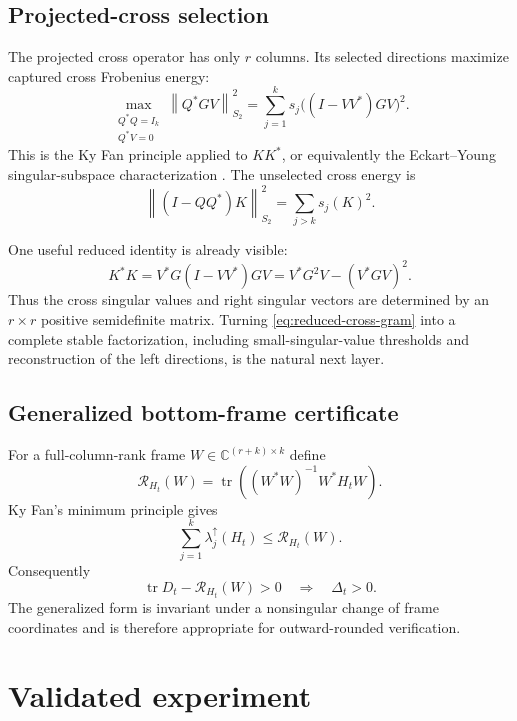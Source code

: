 \documentclass[11pt]{article}
\theoremstyle{definition}
\theoremstyle{remark}
\newcommand{\norm}[1]{\left\lVert#1\right\rVert}
\newcommand{\tr}{\operatorname{tr}}
\begin{document}
\subsection{Projected-cross selection}

The projected cross operator has only $r$ columns.  Its selected directions
maximize captured cross Frobenius energy:
\begin{equation}
 \max_{\substack{Q^*Q=I_k\\Q^*V=0}}
 \norm{Q^*GV}_{S_2}^2
 =\sum_{j=1}^k s_j\big((I-VV^*)GV\big)^2.
 \label{eq:cross-max}
\end{equation}
This is the Ky Fan principle applied to $KK^*$, or equivalently the
Eckart--Young singular-subspace characterization
\citep{GolubVanLoan2013}.  The unselected cross energy is
\begin{equation}
 \norm{(I-QQ^*)K}_{S_2}^2=\sum_{j>k}s_j(K)^2.
 \label{eq:cross-tail}
\end{equation}

One useful reduced identity is already visible:
\begin{equation}
 K^*K
 =V^*G(I-VV^*)GV
 =V^*G^2V-(V^*GV)^2.
 \label{eq:reduced-cross-gram}
\end{equation}
Thus the cross singular values and right singular vectors are determined by
an $r\times r$ positive semidefinite matrix.  Turning
\eqref{eq:reduced-cross-gram} into a complete stable factorization, including
small-singular-value thresholds and reconstruction of the left directions,
is the natural next layer.

\subsection{Generalized bottom-frame certificate}

For a full-column-rank frame
$W\in\mathbb C^{(r+k)\times k}$ define
\[
 \mathcal R_{H_t}(W)
 =\tr\!\left((W^*W)^{-1}W^*H_tW\right).
\]
Ky Fan's minimum principle gives
\[
 \sum_{j=1}^k\lambda_j^\uparrow(H_t)
 \le \mathcal R_{H_t}(W).
\]
Consequently
\begin{equation}
 \tr D_t-\mathcal R_{H_t}(W)>0
 \quad\Longrightarrow\quad
 \Delta_t>0.
 \label{eq:frame}
\end{equation}
The generalized form is invariant under a nonsingular change of frame
coordinates and is therefore appropriate for outward-rounded verification.

\section{Validated experiment}
\label{sec:audit}
\end{document}
